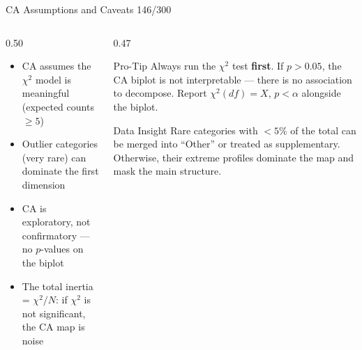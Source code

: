 \documentclass[10pt]{beamer}
\newcommand{\smark}[1]{\hfill{\scriptsize\color{codegray}#1}}
\begin{document}
\begin{frame}{CA Assumptions and Caveats}
\smark{146/300}
\begin{columns}[T]
\begin{column}{0.50\textwidth}
\begin{itemize}
    \item CA assumes the $\chi^2$ model is meaningful (expected counts $\geq 5$)
    \item Outlier categories (very rare) can dominate the first dimension
    \item CA is exploratory, not confirmatory --- no $p$-values on the biplot
    \item The total inertia = $\chi^2 / N$: if $\chi^2$ is not significant, the CA map is noise
\end{itemize}
\end{column}
\begin{column}{0.47\textwidth}
\begin{alertblock}{Pro-Tip}
    \scriptsize Always run the $\chi^2$ test \textbf{first}. If $p > 0.05$, the CA biplot is not interpretable --- there is no association to decompose. Report $\chi^2(df) = X$, $p < \alpha$ alongside the biplot.
\end{alertblock}
\vspace{0.1cm}
\begin{exampleblock}{Data Insight}
    \scriptsize Rare categories with $< 5\%$ of the total can be merged into ``Other'' or treated as supplementary. Otherwise, their extreme profiles dominate the map and mask the main structure.
\end{exampleblock}
\end{column}
\end{columns}
\end{frame}
\end{document}

